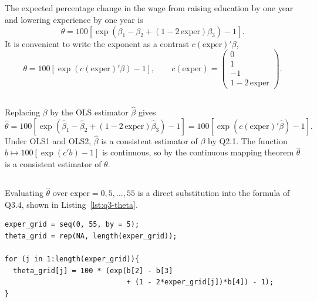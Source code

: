 \documentclass[11pt]{article}
\newcommand{\code}[1]{\texttt{#1}}
\begin{document}
\subsection{}
The expected percentage change in the wage from raising education by one year
and lowering experience by one year is
\[
\theta = 100\left[\exp\!\left(\beta_1 - \beta_2
 + (1-2\,\text{exper})\beta_3\right) - 1\right].
\]
It is convenient to write the exponent as a contrast $c(\text{exper})'\beta$,
\[
\theta = 100\left[\exp\!\left(c(\text{exper})'\beta\right) - 1\right],
\qquad
c(\text{exper}) = \begin{pmatrix} 0 \\ 1 \\ -1 \\ 1-2\,\text{exper}
\end{pmatrix}.
\]

\subsection{}
Replacing $\beta$ by the OLS estimator $\hat\beta$ gives
\[
\hat\theta = 100\left[\exp\!\left(\hat\beta_1 - \hat\beta_2
 + (1-2\,\text{exper})\hat\beta_3\right) - 1\right]
 = 100\left[\exp\!\left(c(\text{exper})'\hat\beta\right) - 1\right].
\]
Under OLS1 and OLS2, $\hat\beta$ is a consistent estimator of $\beta$ by
Q2.1. The function $b \mapsto 100[\exp(c'b)-1]$ is continuous, so by the
continuous mapping theorem $\hat\theta$ is a consistent estimator of $\theta$.

\subsection{}
Evaluating $\hat\theta$ over $\text{exper} = 0, 5, \dots, 55$ is a direct
substitution into the formula of Q3.4, shown in
Listing~\ref{lst:q3-theta}.

\begin{lstlisting}[style=Rcode,caption={Evaluating $\hat\theta$ (excerpt from
\code{R/q3\_cps85\_regression.R}).},label={lst:q3-theta}]
exper_grid = seq(0, 55, by = 5);
theta_grid = rep(NA, length(exper_grid));

for (j in 1:length(exper_grid)){
  theta_grid[j] = 100 * (exp(b[2] - b[3]
                             + (1 - 2*exper_grid[j])*b[4]) - 1);
}
\end{lstlisting}
\end{document}
